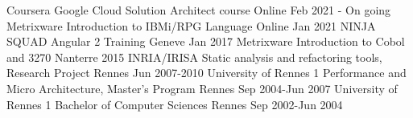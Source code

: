 
\begin{cventries}

\cventry
{Coursera} %
{Google Cloud Solution Architect course} %
{Online} %
{Feb 2021 - On going} %
{
}
\cventry
{Metrixware} %
{Introduction to IBMi/RPG Language} %
{Online} %
{Jan 2021} %
{
}
\cventry
{NINJA SQUAD} %
{Angular 2 Training} %
{Geneve} %
{Jan 2017} %
{
}
\cventry
{Metrixware} %
{Introduction to Cobol and 3270} %
{Nanterre} %
{2015} %
{
}
\cventry
{INRIA/IRISA} %
{Static analysis and refactoring tools, Research Project} %
{Rennes} %
{Jun 2007-2010} %
{
}
\cventry
{University of Rennes 1} %
{Performance and Micro Architecture, Master's Program} %
{Rennes} %
{Sep 2004-Jun 2007} %
{
}
\cventry
{University of Rennes 1} %
{Bachelor of Computer Sciences} %
{Rennes} %
{Sep 2002-Jun 2004} %
{
}
\end{cventries}